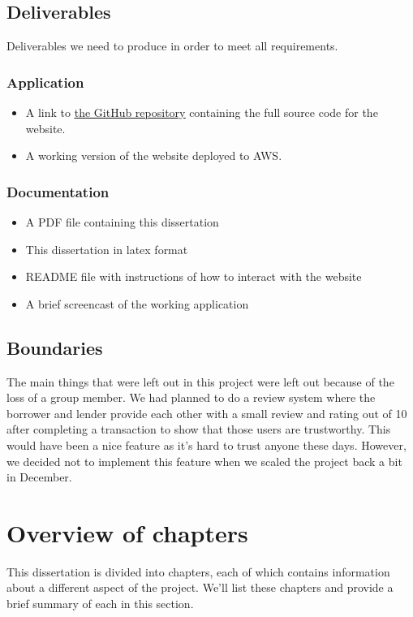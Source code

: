 \subsection{Deliverables}
 Deliverables we need to produce in order to meet all requirements. 
 
\subsubsection{Application}
\begin{itemize}
\item A link to \underline{\href{https://github.com/CathalDonohoe/FinalYearProject}{the GitHub repository}} containing the full source code for the website.
\item A working version of the website deployed to AWS.
\end{itemize}

\subsubsection{Documentation}
\begin{itemize}
\item A PDF file containing this dissertation
\item This dissertation in latex format
\item README file with instructions of how to interact with the website
\item A brief screencast of the working application
\end{itemize}
 
\subsection{Boundaries}
The main things that were left out in this project were left out because of the loss of a group member. We had planned to do a review system where the borrower and lender provide each other with a small review and rating out of 10 after completing a transaction to show that those users are trustworthy. This would have been a nice feature as it's hard to trust anyone these days. However, we decided not to implement this feature when we scaled the project back a bit in December.  

\section{Overview of chapters}
This dissertation is divided into chapters, each of which contains information about a different aspect of the project. We'll list these chapters and provide a brief summary of each in this section. 

